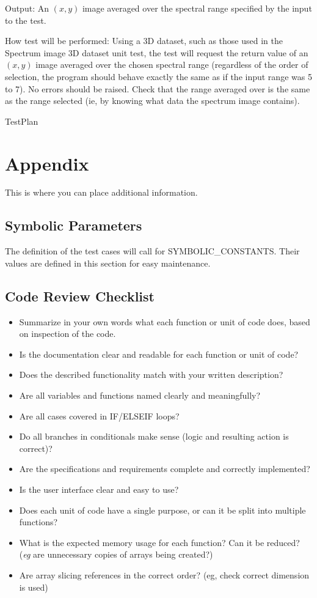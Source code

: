\documentclass[12pt, titlepage]{article}
\begin{document}
\begin{enumerate}
Output: An $(x,y)$ image averaged over the spectral range specified by the input to the test.

How test will be performed: Using a 3D dataset, such as those used in the Spectrum image 3D dataset unit test, the test will request the return value of an $(x,y)$ image averaged over the chosen spectral range (regardless of the order of selection, the program should behave exactly the same as if the input range was 5 to 7). No errors should be raised. Check that the range averaged over is the same as the range selected (ie, by knowing what data the spectrum image contains).

\end{enumerate}

 {TestPlan}

\newpage

\section{Appendix}

This is where you can place additional information.

\subsection{Symbolic Parameters}

The definition of the test cases will call for SYMBOLIC\_CONSTANTS.
Their values are defined in this section for easy maintenance.

\subsection{Code Review Checklist}

\begin{itemize}
\item Summarize in your own words what each function or unit of code does, based on inspection of the code. 
\item Is the documentation clear and readable for each function or unit of code?
\item Does the described functionality match with your written description?
\item Are all variables and functions named clearly and meaningfully?
\item Are all cases covered in IF/ELSEIF loops?
\item Do all branches in conditionals make sense (logic and resulting action is correct)?
\item Are the specifications and requirements complete and correctly implemented?
\item Is the user interface clear and easy to use?
\item Does each unit of code have a single purpose, or can it be split into multiple functions?
\item What is the expected memory usage for each function? Can it be reduced? (\textit{eg} are unnecessary copies of arrays being created?)
\item Are array slicing references in the correct order? (eg, check correct dimension is used)
\end{itemize}
\end{document}
